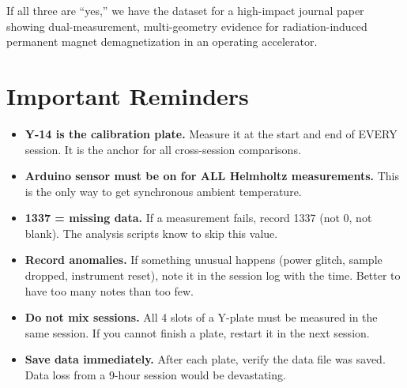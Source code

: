 \documentclass[11pt,letterpaper]{article}
\begin{document}
If all three are ``yes,'' we have the dataset for a high-impact journal paper
showing dual-measurement, multi-geometry evidence for radiation-induced permanent
magnet demagnetization in an operating accelerator.


\section{Important Reminders}
\label{sec:reminders}

\begin{itemize}
  \item \textbf{Y-14 is the calibration plate.} Measure it at the start and end
    of EVERY session. It is the anchor for all cross-session comparisons.

  \item \textbf{Arduino sensor must be on for ALL Helmholtz measurements.} This
    is the only way to get synchronous ambient temperature.

  \item \textbf{1337 = missing data.} If a measurement fails, record 1337 (not 0,
    not blank). The analysis scripts know to skip this value.

  \item \textbf{Record anomalies.} If something unusual happens (power glitch,
    sample dropped, instrument reset), note it in the session log with the time.
    Better to have too many notes than too few.

  \item \textbf{Do not mix sessions.} All 4 slots of a Y-plate must be measured
    in the same session. If you cannot finish a plate, restart it in the next
    session.

  \item \textbf{Save data immediately.} After each plate, verify the data file
    was saved. Data loss from a 9-hour session would be devastating.
\end{itemize}
\end{document}
